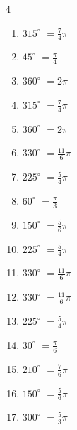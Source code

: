 \begin{multicols}{4}
\begin{enumerate}
  \item $\displaystyle 315^{\circ}$
        $\displaystyle =\frac{7}{4}\pi$

  \item $\displaystyle 45^{\circ}$
        $\displaystyle =\frac{\pi}{4}$

  \item $\displaystyle 360^{\circ}$
        $\displaystyle =2\pi$

  \item $\displaystyle 315^{\circ}$
        $\displaystyle =\frac{7}{4}\pi$

  \item $\displaystyle 360^{\circ}$
        $\displaystyle =2\pi$

  \item $\displaystyle 330^{\circ}$
        $\displaystyle =\frac{11}{6}\pi$

  \item $\displaystyle 225^{\circ}$
        $\displaystyle =\frac{5}{4}\pi$

  \item $\displaystyle 60^{\circ}$
        $\displaystyle =\frac{\pi}{3}$

  \item $\displaystyle 150^{\circ}$
        $\displaystyle =\frac{5}{6}\pi$

  \item $\displaystyle 225^{\circ}$
        $\displaystyle =\frac{5}{4}\pi$

  \item $\displaystyle 330^{\circ}$
        $\displaystyle =\frac{11}{6}\pi$

  \item $\displaystyle 330^{\circ}$
        $\displaystyle =\frac{11}{6}\pi$

  \item $\displaystyle 225^{\circ}$
        $\displaystyle =\frac{5}{4}\pi$

  \item $\displaystyle 30^{\circ}$
        $\displaystyle =\frac{\pi}{6}$

  \item $\displaystyle 210^{\circ}$
        $\displaystyle =\frac{7}{6}\pi$

  \item $\displaystyle 150^{\circ}$
        $\displaystyle =\frac{5}{6}\pi$

\columnbreak %

  \item $\displaystyle 300^{\circ}$
        $\displaystyle =\frac{5}{3}\pi$


\end{enumerate}
\end{multicols}
